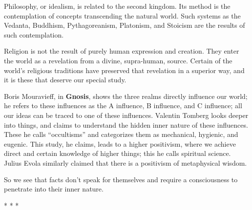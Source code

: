 Philosophy, or idealism, is related to the second kingdom. Its method is the contemplation of concepts transcending the natural world. Such systems as the Vedanta, Buddhism, Pythagoreanism, Platonism, and Stoicism are the results of such contemplation.

Religion is not the result of purely human expression and creation. They enter the world as a revelation from a divine, supra-human, source. Certain of the world's religious traditions have preserved that revelation in a superior way, and it is these that deserve our special study.

Boris Mouravieff, in \textbf{Gnosis}, shows the three realms directly influence our world; he refers to these influences as the A influence, B influence, and C influence; all our ideas can be traced to one of these influences. Valentin Tomberg looks deeper into things, and claims to understand the hidden inner nature of these influences. These he calls ``occultisms'' and categorizes them as mechanical, hygienic, and eugenic. This study, he claims, leads to a higher positivism, where we achieve direct and certain knowledge of higher things; this he calls spiritual science. Julius Evola similarly claimed that there is a positivism of metaphysical wisdom.

So we see that facts don't speak for themselves and require a consciousness to penetrate into their inner nature.



\begin{center}* * *\end{center}

